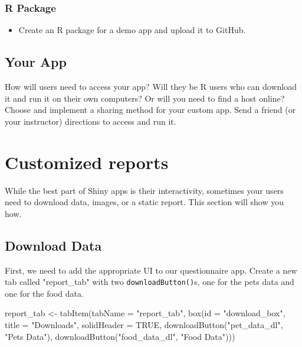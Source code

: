 \documentclass[
  oneside]{book}
\newenvironment{Shaded}{\begin{snugshade}}{\end{snugshade}}
\newcommand{\AttributeTok}[1]{\textcolor[rgb]{0.77,0.63,0.00}{#1}}
\newcommand{\ConstantTok}[1]{\textcolor[rgb]{0.00,0.00,0.00}{#1}}
\newcommand{\FunctionTok}[1]{\textcolor[rgb]{0.00,0.00,0.00}{#1}}
\newcommand{\NormalTok}[1]{#1}
\newcommand{\OtherTok}[1]{\textcolor[rgb]{0.56,0.35,0.01}{#1}}
\newcommand{\StringTok}[1]{\textcolor[rgb]{0.31,0.60,0.02}{#1}}
\providecommand{\tightlist}{%
  \setlength{\itemsep}{0pt}\setlength{\parskip}{0pt}}
\begin{document}
\hypertarget{r-package}{%
\subsection{R Package}\label{r-package}}

\begin{itemize}
\tightlist
\item
  Create an R package for a demo app and upload it to GitHub.
\end{itemize}

\hypertarget{your-app-sharing}{%
\section{Your App}\label{your-app-sharing}}

How will users need to access your app? Will they be R users who can download it and run it on their own computers? Or will you need to find a host online? Choose and implement a sharing method for your custom app. Send a friend (or your instructor) directions to access and run it.

\hypertarget{reports}{%
\chapter{Customized reports}\label{reports}}

While the best part of Shiny apps is their interactivity, sometimes your users need to download data, images, or a static report. This section will show you how.

\hypertarget{download-data}{%
\section{Download Data}\label{download-data}}

First, we need to add the appropriate UI to our questionnaire app. Create a new tab called \StringTok{"report\_tab"} with two \texttt{downloadButton}\texttt{()}s, one for the pets data and one for the food data.

\begin{Shaded}
\begin{Highlighting}[]
\NormalTok{report\_tab }\OtherTok{\textless{}{-}} \FunctionTok{tabItem}\NormalTok{(}\AttributeTok{tabName =} \StringTok{"report\_tab"}\NormalTok{, }\FunctionTok{box}\NormalTok{(}\AttributeTok{id =} \StringTok{"download\_box"}\NormalTok{, }\AttributeTok{title =} \StringTok{"Downloads"}\NormalTok{,}
    \AttributeTok{solidHeader =} \ConstantTok{TRUE}\NormalTok{, }\FunctionTok{downloadButton}\NormalTok{(}\StringTok{"pet\_data\_dl"}\NormalTok{, }\StringTok{"Pets Data"}\NormalTok{), }\FunctionTok{downloadButton}\NormalTok{(}\StringTok{"food\_data\_dl"}\NormalTok{,}
        \StringTok{"Food Data"}\NormalTok{)))}
\end{Highlighting}
\end{Shaded}
\end{document}

